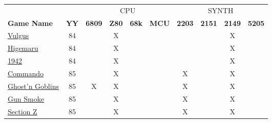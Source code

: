 \begin{figure}[H]
{ 
\setlength{\tabcolsep}{3.0pt}
\setlength\cmidrulewidth{\heavyrulewidth} %
\begin{tabular}{lccccccccc}

  & & \multicolumn{4}{c}{CPU} &  \multicolumn{4}{c}{SYNTH} \\
  \cmidrule(lr){3-6}
  \cmidrule(lr){7-10}
 
  \textbf{Game Name} & \textbf{YY} & \textbf{6809} & \textbf{Z80} & \textbf{68k} & \textbf{MCU} & \textbf{2203} & \textbf{2151} & \textbf{2149} & \textbf{5205} \\               
  \toprule    
\href{https://www.youtube.com/watch?v=45ELzG1ivEA}{Vulgus}
                & 84          &               &      X       &              &              &               &               &       X       &               \\
\href{https://www.youtube.com/watch?v=R5mg6XPqtBs}{Higemaru}
                & 84          &               &      X       &              &              &               &               &       X       &               \\
\href{https://www.youtube.com/watch?v=Em7UwOOBvlA}{1942}
                & 84          &               &      X       &              &              &               &               &       X       &               \\
  \toprule    
\href{https://www.youtube.com/watch?v=1qctKI_t5eY}{Commando}
                & 85          &               &      X       &              &              &       X       &               &       X       &               \\
\href{https://www.youtube.com/watch?v=SugLAqaPhqA}{Ghost'n Goblins}  
                & 85          &       X       &      X       &              &              &       X       &               &       X       &               \\
\href{https://www.youtube.com/watch?v=mrO9qwGXdy8}{Gun Smoke}        
                & 85          &               &      X       &              &              &       X       &               &       X       &               \\
\href{https://www.youtube.com/watch?v=cIC2mNNryZg}{Section Z}
                & 85          &               &      X       &              &              &       X       &               &       X       &               \\

\end{tabular}}
\end{figure}
